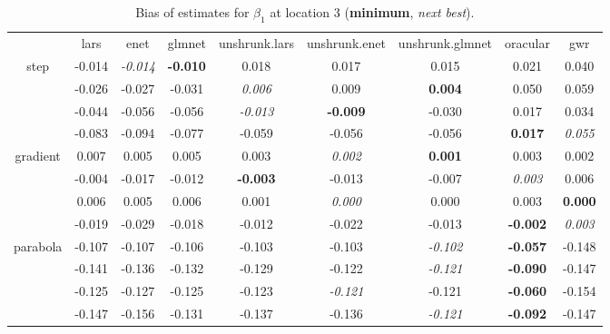 \documentclass[authoryear, review, 11pt]{elsarticle}
\begin{document}
\begin{table}[ht]
\begin{center}
\begin{tabular}{ccccccccc}
  & lars & enet & glmnet & unshrunk.lars & unshrunk.enet & unshrunk.glmnet & oracular & gwr \\ 
  \cline{2-9}
  \multirow{4}{*}{step} & -0.014 & \emph{-0.014} & \textbf{-0.010} & 0.018 & 0.017 & 0.015 & 0.021 & 0.040 \\ 
  & -0.026 & -0.027 & -0.031 & \emph{0.006} & 0.009 & \textbf{0.004} & 0.050 & 0.059 \\ 
  & -0.044 & -0.056 & -0.056 & \emph{-0.013} & \textbf{-0.009} & -0.030 & 0.017 & 0.034 \\ 
  & -0.083 & -0.094 & -0.077 & -0.059 & -0.056 & -0.056 & \textbf{0.017} & \emph{0.055} \\ 
  \cline{2-9}
  \multirow{4}{*}{gradient} & 0.007 & 0.005 & 0.005 & 0.003 & \emph{0.002} & \textbf{0.001} & 0.003 & 0.002 \\ 
  & -0.004 & -0.017 & -0.012 & \textbf{-0.003} & -0.013 & -0.007 & \emph{0.003} & 0.006 \\ 
  & 0.006 & 0.005 & 0.006 & 0.001 & \emph{0.000} & 0.000 & 0.003 & \textbf{0.000} \\ 
  & -0.019 & -0.029 & -0.018 & -0.012 & -0.022 & -0.013 & \textbf{-0.002} & \emph{0.003} \\ 
  \cline{2-9}
  \multirow{4}{*}{parabola} & -0.107 & -0.107 & -0.106 & -0.103 & -0.103 & \emph{-0.102} & \textbf{-0.057} & -0.148 \\ 
  & -0.141 & -0.136 & -0.132 & -0.129 & -0.122 & \emph{-0.121} & \textbf{-0.090} & -0.147 \\ 
  & -0.125 & -0.127 & -0.125 & -0.123 & \emph{-0.121} & -0.121 & \textbf{-0.060} & -0.154 \\ 
  & -0.147 & -0.156 & -0.131 & -0.137 & -0.136 & \emph{-0.121} & \textbf{-0.092} & -0.147 \\ 
  \end{tabular}
\caption{Bias of estimates for $\beta_1$ at location 3 (\textbf{minimum}, \emph{next best}).\label{table:loc3-X1-BiasX}}
\end{center}
\end{table}
\end{document}
